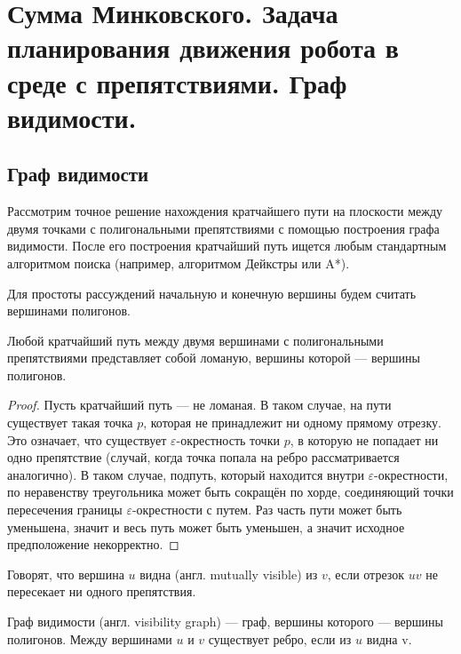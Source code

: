\section{Сумма Минковского.  Задача планирования движения робота в среде с препятствиями. Граф видимости.}

\subsection{Граф видимости}

Рассмотрим точное решение нахождения кратчайшего пути на плоскости между двумя точками с полигональными препятствиями с помощью построения графа видимости.
После его построения кратчайший путь ищется любым стандартным алгоритмом поиска (например, алгоритмом Дейкстры или A*).

Для простоты рассуждений начальную и конечную вершины будем считать вершинами полигонов. 

\begin{lemma}
    Любой кратчайший путь между двумя вершинами с полигональными препятствиями представляет собой ломаную, вершины которой — вершины полигонов.
\end{lemma}
\begin{proof}
    Пусть кратчайший путь --- не ломаная.
    В таком случае, на пути существует такая точка $p$, которая не принадлежит ни одному прямому отрезку.
    Это означает, что существует $\varepsilon$-окрестность точки $p$, в которую не попадает ни одно препятствие (случай, когда точка попала на ребро рассматривается аналогично).
    В таком случае, подпуть, который находится внутри $\varepsilon$-окрестности, по неравенству треугольника может быть сокращён по хорде, соединяющий точки пересечения границы $\varepsilon$-окрестности с путем.
    Раз часть пути может быть уменьшена, значит и весь путь может быть уменьшен, а значит исходное предположение некорректно. 
\end{proof}

\begin{definition}
    Говорят, что вершина $u$ видна (англ. mutually visible) из $v$, если отрезок $uv$ не пересекает ни одного препятствия.
\end{definition}

\begin{definition}
    Граф видимости (англ. visibility graph) --- граф, вершины которого --- вершины полигонов.
    Между вершинами $u$ и $v$ существует ребро, если из $u$ видна v.
\end{definition}

